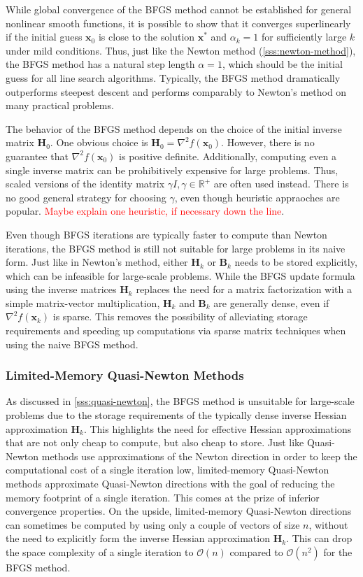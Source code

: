 While global convergence of the BFGS method cannot be established for general nonlinear smooth functions, it is possible to show that it converges 
superlinearly if the initial guess $\bm{x}_0$ is close to the solution $\bm{x}^*$ and $\alpha_k = 1$ for sufficiently large $k$ \cite{nocedal2006}
under mild conditions. Thus, just like the Newton method (\cref{sss:newton-method}), the BFGS method has a natural step length $\alpha=1$,
which should be the initial guess for all line search algorithms. Typically, the BFGS method dramatically outperforms steepest 
descent and performs comparably to Newton's method on many practical problems. 

The behavior of the BFGS method depends on the choice of the initial inverse matrix $\bm{H}_0$. One obvious choice is $\bm{H}_0 = \nabla^2 
f(\bm{x}_0)$. However, there is no guarantee that $\nabla^2 f(\bm{x}_0)$ is positive definite. Additionally, computing even a single inverse
matrix can be prohibitively expensive for large problems. Thus, scaled versions of the identity matrix $\gamma I, \gamma \in \mathbb{R}^+$ are
often used instead. There is no good general strategy for choosing $\gamma$, even though heuristic appraoches are popular. \textcolor{red}{Maybe
explain one heuristic, if necessary down the line}.

Even though BFGS iterations are typically faster to compute than Newton iterations, the BFGS method is still not suitable for large problems 
in its naive form. Just like in Newton's method, either $\bm{H}_k$ or $\bm{B}_k$ needs to be stored explicitly, which can be infeasible for 
large-scale problems. While the BFGS update formula using the inverse matrices $\bm{H}_k$ replaces the need for a matrix factorization with a simple 
matrix-vector multiplication, $\bm{H}_k$ and $\bm{B}_k$ are generally dense, even if $\nabla^2 f(\bm{x}_k)$ is sparse. This removes the possibility
of alleviating storage requirements and speeding up computations via sparse matrix techniques when using the naive BFGS method.

\subsubsection{Limited-Memory Quasi-Newton Methods}\label{sss:limited-memory-quasi-newton}
As discussed in \cref{sss:quasi-newton}, the BFGS method is unsuitable for large-scale problems due to the storage requirements of the 
typically dense inverse Hessian approximation $\bm{H}_k$. This highlights the need for effective Hessian approximations that are not only
cheap to compute, but also cheap to store. Just like Quasi-Newton methods use approximations of the Newton direction in order to keep 
the computational cost of a single iteration low, limited-memory Quasi-Newton methods approximate Quasi-Newton directions with 
the goal of reducing the memory footprint of a single iteration. This comes at the prize of inferior convergence properties. On the upside,
limited-memory Quasi-Newton directions can sometimes be computed by using only a couple of vectors of size $n$, without the need to 
explicitly form the inverse Hessian approximation $\bm{H}_k$. This can drop the space complexity of a single iteration to $\mathcal{O}(n)$ 
compared to $\mathcal{O}(n^2)$ for the BFGS method.

